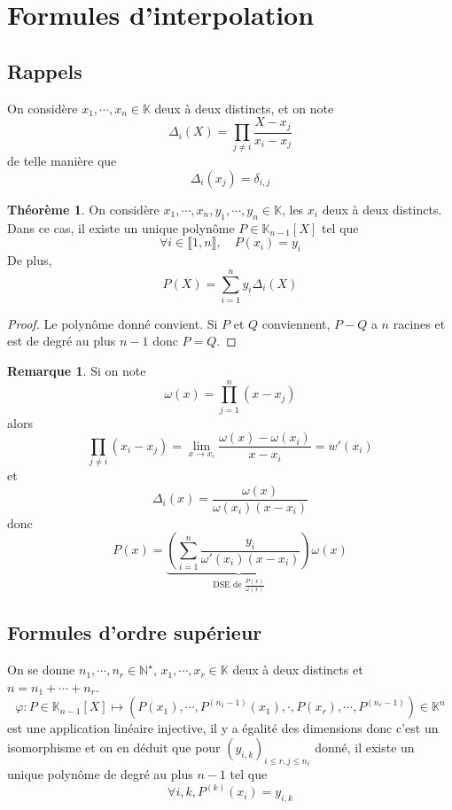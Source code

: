 \documentclass{article}
\theoremstyle{definition}
\newtheorem*{thm}{Théorème}
\newtheorem*{rem}{Remarque}
\begin{document}
\section{Formules d'interpolation}

\subsection{Rappels}

On considère $x_1, \cdots, x_n\in\mathbb K$ deux à deux distincts, et on note \[
    \Delta_i(X)=\prod_{j\neq i}\frac{X-x_j}{x_i-x_j}
\]
de telle manière que \[
    \Delta_i(x_j)=\delta_{i, j}
\]

\begin{thm}
    On considère $x_1, \cdots, x_n, y_1, \cdots, y_n\in\mathbb K$, les $x_i$ deux à deux distincts. Dans ce cas, il existe un unique polynôme $P\in\mathbb K_{n-1}[X]$ tel que \[\forall i\in\llbracket 1, n\rrbracket, \quad P(x_i)=y_i\]
    De plus, \[
        P(X)=\sum_{i=1}^ny_i\Delta_i(X)
    \]
\end{thm}

\begin{proof}
Le polynôme donné convient. Si $P$ et $Q$ conviennent, $P-Q$ a $n$ racines et est de degré au plus $n-1$ donc $P=Q$.
\end{proof}

\begin{rem}
Si on note \[
    \omega (x)=\prod_{j=1}^n(x-x_j)
\]
alors \[
    \prod_{j\neq i}(x_i-x_j)=\lim_{x\to x_i}\frac{\omega(x)-\omega(x_i)}{x-x_i}=w'(x_i)
\]
et \[
    \Delta_i(x)=\frac{\omega (x)}{\omega(x_i)(x-x_i)}
\]
donc \[
    P(x)=\underbrace{\left(\sum_{i=1}^n\frac{y_i}{\omega'(x_i)(x-x_i)}\right)}_{\text{DSE de }\frac{P(x)}{\omega(x)}}\omega(x)
\]
\end{rem}

\subsection{Formules d'ordre supérieur}

On se donne $n_1, \cdots, n_r\in\mathbb N^\star$, $x_1, \cdots, x_r\in\mathbb K$ deux à deux distincts et $n=n_1+\cdots+n_r$. \[
    \varphi: P\in\mathbb K_{n-1}[X]\longmapsto(P(x_1), \cdots, P^{(n_1-1)}(x_1), \cdot, P(x_r), \cdots, P^{(n_r-1)})\in\mathbb K^n
\]
est une application linéaire injective, il y a égalité des dimensions donc c'est un isomorphisme et on en déduit que pour $(y_{i, k})_{i\leq r, j\leq n_i}$ donné, il existe un unique polynôme de degré au plus $n-1$ tel que \[
    \forall i, k, P^{(k)}(x_i)=y_{i, k}
\]
\end{document}

